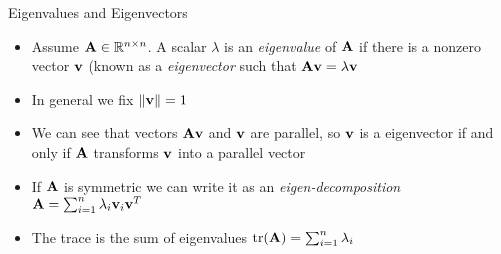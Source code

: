 \documentclass{beamer}
\begin{document}
\begin{frame}{Eigenvalues and Eigenvectors}  
\begin{itemize} 
 \item Assume $\textbf{A} \in \mathbb{R}^{n \times n}$. A scalar $\lambda$ is an \emph{eigenvalue} of $\textbf{A}$ if there is a nonzero vector $\textbf{v}$ (known as a \emph{eigenvector} such that $\textbf{A}\textbf{v} = \lambda\textbf{v}$
 \item In general we fix $\|\textbf{v}\| = 1$ 
 \item We can see that vectors $\textbf{A}\textbf{v}$ and $\textbf{v}$ are parallel, so $\textbf{v}$ is a eigenvector if and only if $\textbf{A}$ transforms $\textbf{v}$ into a parallel vector  
 \item If $\textbf{A}$ is symmetric we can write it as an \emph{eigen-decomposition} $\textbf{A} = \sum_{i=1}^n \lambda_i\textbf{v}_i\textbf{v}^T$ 
 \item The trace is the sum of eigenvalues $\mbox{tr}(\textbf{A}) = \sum_{i=1}^n \lambda_i$
\end{itemize}
\end{frame}
\end{document}
